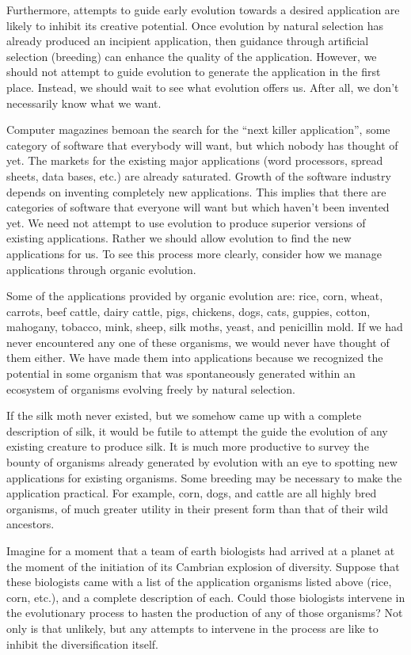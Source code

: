 Furthermore, attempts to guide early evolution towards a desired application
are likely to inhibit its creative potential.  Once evolution
by natural selection has already produced an incipient application, then
guidance through artificial selection (breeding) can enhance the quality
of the application.  However, we should not attempt to guide evolution to
generate the application in the first place.  Instead, we should wait to
see what evolution offers us.  After all, we don't necessarily know what
we want.

Computer magazines bemoan the search for the ``next killer application'',
some category of software that everybody will want, but which nobody has
thought of yet.  The markets for the existing major applications (word
processors, spread sheets, data bases, etc.) are already saturated.
Growth of the software industry depends on inventing completely new
applications.  This implies that there are categories of software that
everyone will want but which haven't been invented yet.
We need not attempt to use evolution to produce superior
versions of existing applications.  Rather we should allow evolution to
find the new applications for us.  To see this process more clearly,
consider how we manage applications through organic evolution.

Some of the applications provided by organic evolution are: rice, corn,
wheat, carrots, beef cattle, dairy cattle, pigs, chickens, dogs,
cats, guppies, cotton, mahogany, tobacco, mink, sheep, silk moths,
yeast, and penicillin mold.  If we had never encountered any one of
these organisms, we would never have thought of them either.  We have
made them into applications because we recognized the potential in some
organism that was spontaneously generated within an ecosystem of
organisms evolving freely by natural selection.

If the silk moth never existed, but we somehow came up with a complete
description of silk, it would be futile to attempt the guide the evolution
of any existing creature to produce silk.  It is much more productive to
survey the bounty of organisms already generated by evolution with an eye
to spotting new applications for existing organisms.  Some breeding may
be necessary to make the application practical.  For example, corn, dogs,
and cattle are all highly bred organisms, of much greater utility in their
present form than that of their wild ancestors.

Imagine for a moment that a team of earth biologists had arrived at a
planet at the moment of the initiation of its Cambrian explosion of
diversity.  Suppose that these biologists came with a list of the
application organisms listed above (rice, corn, etc.), and a complete
description of each.  Could those biologists intervene in the
evolutionary process to hasten the production of any of those
organisms?  Not only is that unlikely, but any attempts to intervene in
the process are like to inhibit the diversification itself.

